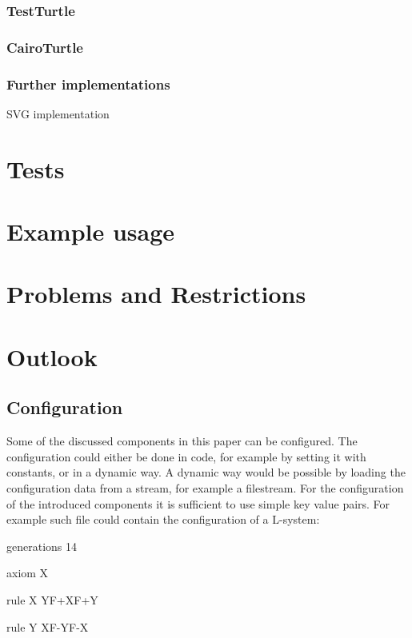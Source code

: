 \documentclass[english]{cpp-hmwk}
\begin{document}
\subsubsection{TestTurtle}
\subsubsection{CairoTurtle}
\subsubsection{Further implementations}
SVG implementation


\section{Tests}
\section{Example usage}
\section{Problems and Restrictions}
\section{Outlook}



\subsection{Configuration}
Some of the discussed components in this paper can be configured. The configuration could either be done in code, for example by setting it with constants, or in a dynamic way. A dynamic way would be possible by loading the configuration data from a stream, for example a filestream.
For the configuration of the introduced components it is sufficient to use simple key value pairs. For example such file could contain the configuration of a L-system:

\medskip

generations 14

axiom X

rule X YF+XF+Y

rule Y XF-YF-X

\medskip
\end{document}
